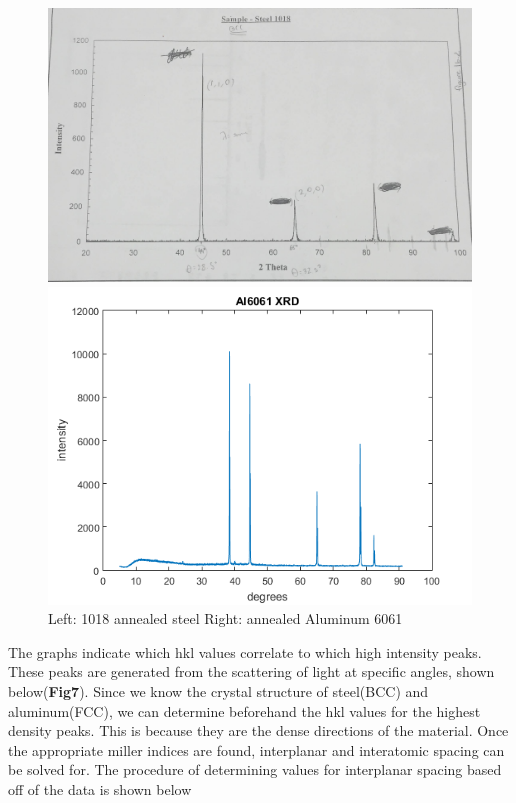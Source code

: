 \documentclass{article}
\begin{document}
\begin{figure}[h]
	\begin{minipage}{.5\textwidth}
		\centering
		\includegraphics[scale=.11]{SteelXRD.jpg}
	\end{minipage}		
	\begin{minipage}{.5\textwidth}
		\centering
		\includegraphics[scale=.6]{ALXRD.png}
	\end{minipage}
	\caption{Left: 1018 annealed steel Right: annealed Aluminum 6061}
\end{figure}

The graphs indicate which hkl values correlate to which high intensity peaks. These peaks are generated from the scattering of light at specific angles, shown below(\textbf{Fig7}). Since we know the crystal structure of steel(BCC) and aluminum(FCC), we can determine beforehand the hkl values for the highest density peaks. This is because they are the dense directions of the material. Once the appropriate miller indices are found, interplanar and interatomic spacing can be solved for. The procedure of determining values for interplanar spacing based off of the data is shown below
\end{document}
